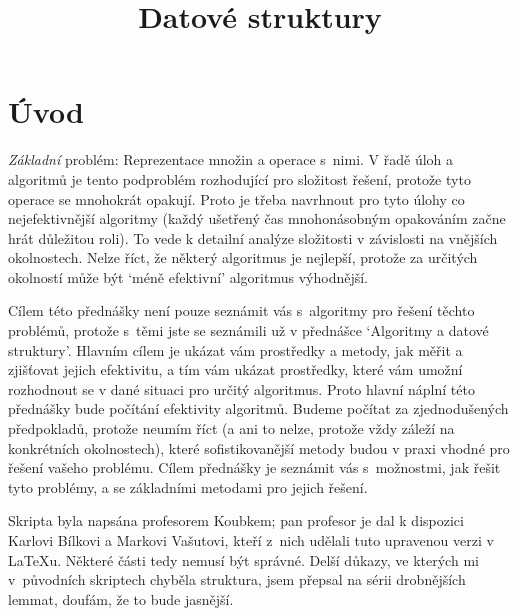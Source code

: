\documentclass[a4paper,12pt]{article}
\DeclareMathOperator*{\Prob}{Prob}
\begin{document}
     

\newtheorem*{dusledek}{Důsledek}
\newtheorem*{lemma}{Lemma}

\newtheorem{counter}{Counter}
\newtheorem{lemma_counting}[counter]{Lemma}
\newtheorem{dusledek_counting}[counter]{Důsledek}

\newtheorem*{pozorovani}{Pozorování}

\newtheorem*{veta}{Věta}
\newtheorem*{tvrzeni}{Tvrzení}
\newtheorem*{definice}{Definice}


\def \Prob{\operatorname{Prob}}
\def \var{\operatorname{var}}

\title{Datové struktury}
\date{}
\maketitle

\tableofcontents

\section{Úvod}
\emph{Základní} problém: Reprezentace množin a 
operace s~nimi. V řadě úloh a algoritmů je tento 
podproblém rozhodující pro složitost řešení, protože 
tyto operace se mnohokrát opakují. Proto je třeba 
navrhnout pro tyto úlohy co nejefektivnější algoritmy 
(každý ušetřený čas mnohonásobným opakováním začne 
hrát důležitou roli). To vede k detailní 
analýze složitosti v závislosti na vnějších okolnostech. 
Nelze říct, 
že některý algoritmus je nejlepší, protože za určitých 
okolností může být `méně efektivní' algoritmus 
výhodnější.

Cílem této přednášky není pouze seznámit vás s~algoritmy 
pro řešení těchto problémů, protože s~těmi jste se 
seznámili už v přednášce `Algoritmy a datové struktury'. Hlavním cílem 
je ukázat vám prostředky a metody, jak měřit a zjišťovat 
jejich efektivitu, a tím vám ukázat prostřed\-ky, které vám 
umožní rozhodnout se v dané situaci pro určitý algoritmus. 
Proto hlavní náplní této přednášky bude počítání efektivity 
algoritmů. Budeme počítat za 
zjednoduše\-ných 
předpokladů, protože neumím říct (a ani to nelze, protože vždy záleží 
na konkrétních okolnostech), které sofistikovanější metody 
budou v praxi vhodné pro řešení vašeho problému. Cílem přednášky je 
seznámit vás s~možnostmi, jak řešit tyto problémy, a se základními 
metodami pro jejich řešení.

Skripta byla napsána profesorem Koubkem; pan profesor je dal k dispozici Karlovi Bílkovi a Markovi Vašutovi, kteří z~nich  udělali tuto upravenou verzi v LaTeXu. Některé části tedy nemusí být správné. Delší důkazy, ve kterých mi v~původních skriptech chyběla struktura, jsem přepsal na sérii drobnějších lemmat, doufám, že to bude jasnější.
\end{document}
